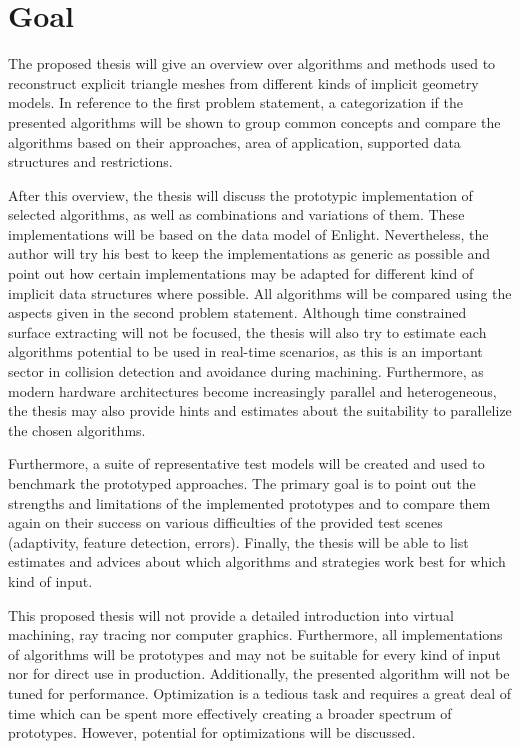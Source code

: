 
\section{Goal}

The proposed thesis will give an overview over algorithms and methods used to reconstruct explicit triangle meshes from different kinds of implicit geometry models. In reference to the first problem statement, a categorization if the presented algorithms will be shown to group common concepts and compare the algorithms based on their approaches, area of application, supported data structures and restrictions.

After this overview, the thesis will discuss the prototypic implementation of selected algorithms, as well as combinations and variations of them. These implementations will be based on the data model of Enlight. Nevertheless, the author will try his best to keep the implementations as generic as possible and point out how certain implementations may be adapted for different kind of implicit data structures where possible. All algorithms will be compared using the aspects given in the second problem statement. Although time constrained surface extracting will not be focused, the thesis will also try to estimate each algorithms potential to be used in real-time scenarios, as this is an important sector in collision detection and avoidance during machining. Furthermore, as modern hardware architectures become increasingly parallel and heterogeneous, the thesis may also provide hints and estimates about the suitability to parallelize the chosen algorithms.

Furthermore, a suite of representative test models will be created and used to benchmark the prototyped approaches. The primary goal is to point out the strengths and limitations of the implemented prototypes and to compare them again on their success on various difficulties of the provided test scenes (\eg adaptivity, feature detection, errors). Finally, the thesis will be able to list estimates and advices about which algorithms and strategies work best for which kind of input.

This proposed thesis will not provide a detailed introduction into virtual machining, ray tracing nor computer graphics. Furthermore, all implementations of algorithms will be prototypes and may not be suitable for every kind of input nor for direct use in production. Additionally, the presented algorithm will not be tuned for performance. Optimization is a tedious task and requires a great deal of time which can be spent more effectively creating a broader spectrum of prototypes. However, potential for optimizations will be discussed.

